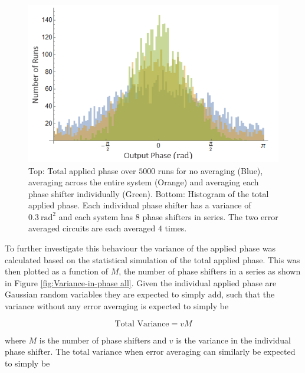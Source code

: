 \documentclass[aps,pra,twocolumn,superscriptaddress,numerical]{revtex4-1}
\begin{document}
			
			\begin{figure}
				\begin{centering}
					\includegraphics[width=\columnwidth]{totPhase2.png}
					\par\end{centering}
				
				\caption[Statistical simulation of total applied phase for no correction, correcting across the system and correcting each element individually for a smaller system. ]{Top: Total applied phase over $5000$ runs for no averaging (Blue), averaging across the entire system (Orange) and averaging each phase shifter individually (Green). Bottom: Histogram of the total applied phase. Each individual phase shifter has a variance of $0.3\ \textrm{rad}^{2}$ and each system has $8$ phase shifters in series. The two error averaged circuits are each averaged $4$ times. \label{fig:Total-applied-phase2}}
			\end{figure}
			
			
			To further investigate this behaviour the variance of the applied phase was calculated based on the statistical simulation of the total applied phase. This was then plotted as a function of $M$, the number of phase shifters in a series as shown in Figure \ref{fig:Variance-in-phase all}. Given the individual applied phase are Gaussian random variables they are expected to simply add, such that the variance without any error averaging is expected to simply be
			
			\begin{equation}
				\textrm{Total Variance}=vM\label{eq:Tot Var no correction}
			\end{equation}
			
			
			where $M$ is the number of phase shifters and $v$ is the variance in the individual phase shifter. The total variance when error averaging can similarly be expected to simply be
			
\end{document}
